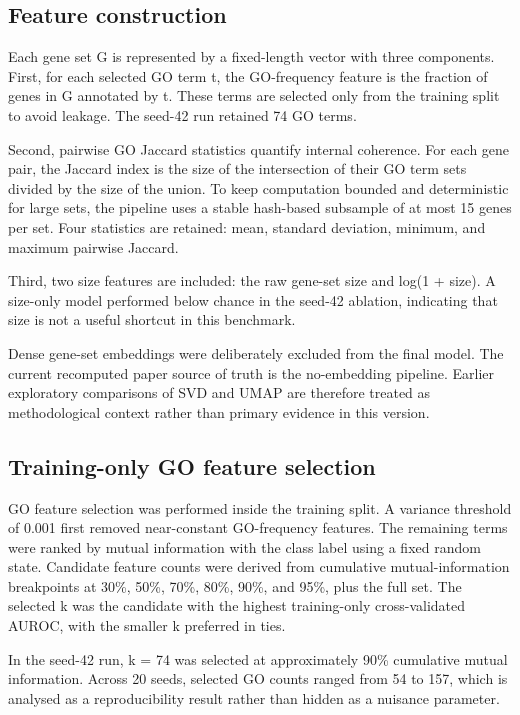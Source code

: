 \documentclass[11pt]{article}
\begin{document}
\subsection{Feature construction}
Each gene set G is represented by a fixed-length vector with three components. First, for each selected GO term t, the GO-frequency feature is the fraction of genes in G annotated by t. These terms are selected only from the training split to avoid leakage. The seed-42 run retained 74 GO terms.

Second, pairwise GO Jaccard statistics quantify internal coherence. For each gene pair, the Jaccard index is the size of the intersection of their GO term sets divided by the size of the union. To keep computation bounded and deterministic for large sets, the pipeline uses a stable hash-based subsample of at most 15 genes per set. Four statistics are retained: mean, standard deviation, minimum, and maximum pairwise Jaccard.

Third, two size features are included: the raw gene-set size and log(1 + size). A size-only model performed below chance in the seed-42 ablation, indicating that size is not a useful shortcut in this benchmark.

Dense gene-set embeddings were deliberately excluded from the final model. The current recomputed paper source of truth is the no-embedding pipeline. Earlier exploratory comparisons of SVD and UMAP are therefore treated as methodological context rather than primary evidence in this version.

\subsection{Training-only GO feature selection}
GO feature selection was performed inside the training split. A variance threshold of 0.001 first removed near-constant GO-frequency features. The remaining terms were ranked by mutual information with the class label using a fixed random state. Candidate feature counts were derived from cumulative mutual-information breakpoints at 30\%, 50\%, 70\%, 80\%, 90\%, and 95\%, plus the full set. The selected k was the candidate with the highest training-only cross-validated AUROC, with the smaller k preferred in ties.

In the seed-42 run, k = 74 was selected at approximately 90\% cumulative mutual information. Across 20 seeds, selected GO counts ranged from 54 to 157, which is analysed as a reproducibility result rather than hidden as a nuisance parameter.
\end{document}
